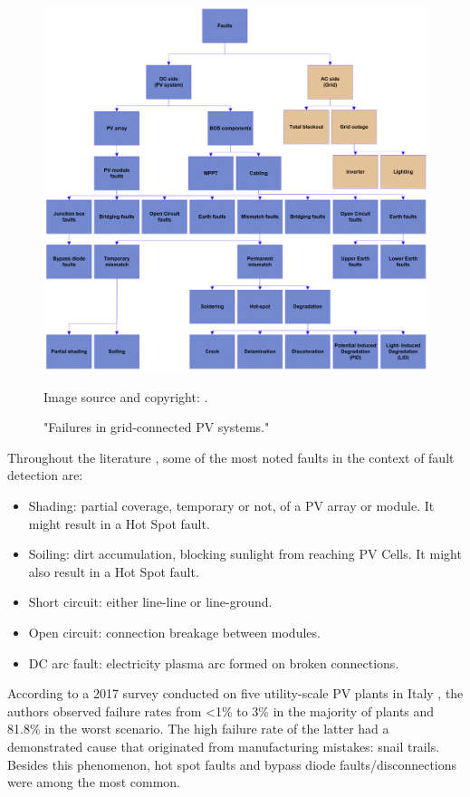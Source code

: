 \begin{figure}[h!]
    \centering
    \includegraphics[width=14cm]{figures/chapter2/faults.png} \caption{"Failures in grid-connected PV systems."} Image source and copyright: \cite{Pillai2018}.
    \label{fig:faults}
\end{figure}

Throughout the literature \cite{Braun2011}, some of the most noted faults in the context of fault detection are:

\begin{itemize}
    \item Shading: partial coverage, temporary or not, of a PV array or module. It might result in a Hot Spot fault.
    \item Soiling: dirt accumulation, blocking sunlight from reaching PV Cells. It might also result in a Hot Spot fault.
    \item Short circuit: either line-line or line-ground.
    \item Open circuit: connection breakage between modules.
    \item DC arc fault: electricity plasma arc formed on broken connections.
\end{itemize}

According to a 2017 survey conducted on five utility-scale PV plants in Italy \cite{Grimaccia2017}, the authors observed failure rates from <1\% to 3\% in the majority of plants and 81.8\% in the worst scenario. The high failure rate of the latter had a demonstrated cause that originated from manufacturing mistakes: snail trails. Besides this phenomenon, hot spot faults and bypass diode faults/disconnections were among the most common.

